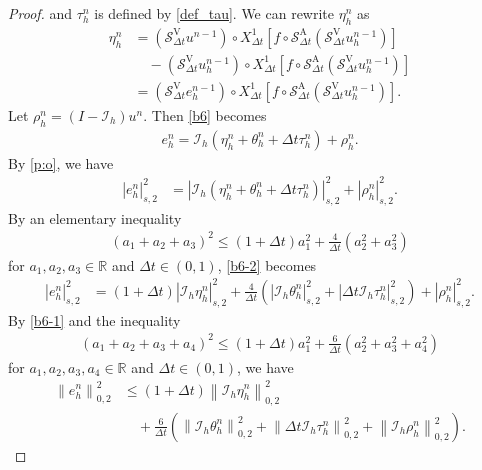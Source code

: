 \documentclass[10pt,a4paper,tbtags,leqno]{amsart}
\theoremstyle{definition}
\numberwithin{equation}{section}
\def\norm#1#2{\left\|#2\right\|_{#1}}
\def\snorm#1#2{\left|#2\right|_{#1}}
\begin{document}
\begin{proof}
  and $ \tau_h^n $ is defined by \eqref{def_tau}. We can rewrite $ \eta_h^n $ as 
  \begin{align}
    \eta_h^n & = (\mathcal{S}_{\Delta t}^{\mathrm{V}} u^{n - 1}) \circ {X_{\Delta t}^1} [f \circ \mathcal{S}_{\Delta t}^{\mathrm{A}} (\mathcal{S}_{\Delta t}^{\mathrm{V}} u_h^{n - 1})] \\ & \quad - (\mathcal{S}_{\Delta t}^{\mathrm{V}} u_h^{n - 1}) \circ {X_{\Delta t}^1} [f \circ \mathcal{S}_{\Delta t}^{\mathrm{A}} (\mathcal{S}_{\Delta t}^{\mathrm{V}} u_h^{n - 1})] \\
    & = (\mathcal{S}_{\Delta t}^{\mathrm{V}} e_h^{n - 1}) \circ {X_{\Delta t}^1} [f \circ \mathcal{S}_{\Delta t}^{\mathrm{A}} (\mathcal{S}_{\Delta t}^{\mathrm{V}} u_h^{n - 1})]. \label{b9-2} 
  \end{align}
  Let $ \rho_h^n = (I - \mathcal{I}_{h}) u^n $. Then \eqref{b6} becomes 
  \begin{align}
    e_h^n = \mathcal{I}_{h} (\eta_h^n + \theta_h^n + \Delta t \tau_h^n) + \rho_h^n. \label{b6-1}
  \end{align}
  By \eqref{p:o}, we have 
  \begin{align}
    \snorm{s, 2}{e_h^n}^2 & = \snorm{s, 2}{\mathcal{I}_{h} (\eta_h^n + \theta_h^n + \Delta t \tau_h^n)}^2 + \snorm{s, 2}{\rho_h^n}^2. \label{b6-2} 
  \end{align}
  By an elementary inequality
  \begin{align} 
    (a_1 + a_2 + a_3)^2 \leq (1 + \Delta t) a_1^2 + \frac{4}{\Delta t} (a_2^2 + a_3^2) 
  \end{align} 
   for $ a_1, a_2, a_3 \in \mathbb{R} $ and $ \Delta t \in (0, 1) $, \eqref{b6-2} becomes 
  \begin{align} 
    \snorm{s, 2}{e_h^n}^2 & = \left(1 + \Delta t \right) \snorm{s, 2}{\mathcal{I}_{h} \eta_h^n}^2 + \frac{4}{\Delta t} \left(\snorm{s, 2}{\mathcal{I}_{h} \theta_h^n}^2 + \snorm{s, 2}{\Delta t \mathcal{I}_{h} \tau_h^n}^2\right) + \snorm{s, 2}{\rho_h^n}^2. \label{b12-1}
  \end{align} 
  By \eqref{b6-1} and the inequality 
  \begin{align}
    (a_1 + a_2 + a_3 + a_4)^2 \leq (1 + \Delta t) a_1^2 + \frac{6}{\Delta t} (a_2^2 + a_3^2 + a_4^2) 
  \end{align} 
  for $ a_1, a_2, a_3, a_4 \in \mathbb{R} $ and $ \Delta t \in (0, 1) $, we have 
  \begin{align} 
    \norm{0, 2}{e_h^n}^2 & \leq (1 + \Delta t) \norm{0, 2}{\mathcal{I}_{h} \eta_h^n}^2 \\ & \quad + \frac{6}{\Delta t} \left(\norm{0, 2}{\mathcal{I}_{h} \theta_h^n}^2 + \norm{0, 2}{\Delta t \mathcal{I}_{h} \tau_h^n}^2 + \norm{0, 2}{\mathcal{I}_{h} \rho_h^n}^2\right). \label{b12-2} 

\end{align}
\end{proof}
\end{document}
